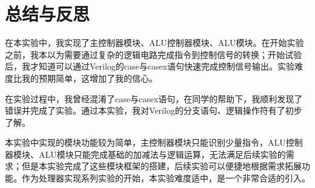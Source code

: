 \documentclass[UTF8]{ctexart}
\begin{document}
\section{总结与反思}\label{sec4}
在本实验中，我实现了主控制器模块、ALU控制器模块、ALU模块。在开始实验之前，我本以为需要通过复杂的逻辑电路完成指令到控制信号的转换；开始试验后，我才知道可以通过Verilog的case与casex语句快速完成控制信号输出。实验难度比我的预期简单，这增加了我的信心。\par
在实验过程中，我曾经混淆了case与casex语句，在同学的帮助下，我顺利发现了错误并完成了实验。通过本实验，我对Verilog的分支语句、逻辑操作符有了初步了解。\par
本实验中实现的模块功能较为简单，主控制器模块只能识别少量指令，ALU控制器模块、ALU模块只能完成基础的加减法与逻辑运算，无法满足后续实验的需求；但是本实验完成了这些模块框架的搭建，后续实验可以便捷地根据需求拓展功能。作为处理器实现系列实验的开始，本实验难度适中，是一个非常合适的引入。
\end{document}
